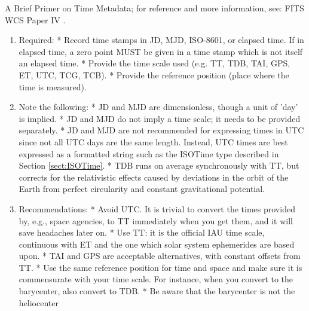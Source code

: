     A Brief Primer on Time Metadata; for reference and more information, see: FITS WCS Paper IV \citep{2015A+A...574A..36R}.
    \begin{enumerate}
    \item  Required:\newline
     * Record time stamps in JD, MJD, ISO-8601, or elapsed time. If in elapsed time, a zero point MUST be given in a time stamp which is not itself an elapsed time. \newline
     * Provide the time scale used (e.g. TT, TDB, TAI, GPS, ET, UTC, TCG, TCB). \newline
     * Provide the reference position (place where the time is measured).
    \item  Note the following:  \newline
     * JD and MJD are dimensionless, though a unit of 'day' is implied.  \newline
     * JD and MJD do not imply a time scale; it needs to be provided separately.  \newline
     * JD and MJD are not recommended for expressing times in UTC since not all UTC days are the same length.  Instead, UTC times are best expressed as a formatted string such as the ISOTime type described in Section \ref{sect:ISOTime}. \newline
     * TDB runs on average synchronously with TT, but corrects for the relativistic effects caused by deviations in the orbit of the Earth from perfect circularity and constant gravitational potential. \newline
    \item Recommendations:  \newline
     * Avoid UTC. It is trivial to convert the times provided by, e.g., space agencies, to TT immediately when you get them, and it will save headaches later on.  \newline
     * Use TT: it is the official IAU time scale, continuous with ET and the one which solar system ephemerides are based upon.  \newline
     * TAI and GPS are acceptable alternatives, with constant offsets from TT.  \newline
     * Use the same reference position for time and space and make sure it is commensurate with your time scale. For instance, when you convert to the barycenter, also convert to TDB.  \newline
     * Be aware that the barycenter is not the heliocenter  \newline

\end{enumerate}
